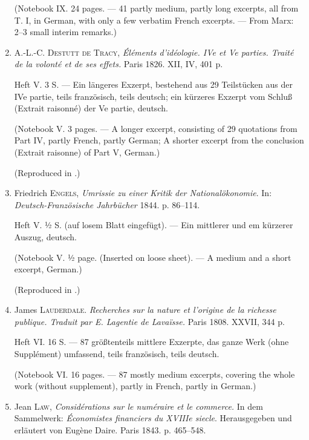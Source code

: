 \begin{enumerate}
    (Notebook IX. 24 pages. --- 41 partly medium, partly long excerpts, all from T. I, in German, with only a few verbatim French excerpts. --- From Marx: 2--3 small interim remarks.)
    
    \item A.-L.-C. \textsc{Destutt de Tracy}, \textit{Éléments d'idéologie. IVe et Ve parties. Traité de la volonté et de ses effets.} Paris 1826. XII, IV, 401 p.
    
    Heft V. 3 S. --- Ein längeres Exzerpt, bestehend aus 29 Teilstücken aus der IVe partie, teils französisch, teils deutsch; ein kürzeres Exzerpt vom Schluß (Extrait raisonné) der Ve partie, deutsch.
    
    (Notebook V. 3 pages. --- A longer excerpt, consisting of 29 quotations from Part IV, partly French, partly German; A shorter excerpt from the conclusion (Extrait raisonne) of Part V, German.)
    
    (Reproduced in .)
    
    \item Friedrich \textsc{Engels}, \textit{Umrissie zu einer Kritik der Nationalökonomie}. In: \textit{Deutsch-Französische Jahrbücher} 1844. p. 86--114.
    
    Heft V. ½ S. (auf losem Blatt eingefügt). --- Ein mittlerer und em kürzerer Auszug, deutsch.
    
    (Notebook V. ½ page. (Inserted on loose sheet). --- A medium and a short excerpt, German.)
    
    (Reproduced in .)
    
    \item James \textsc{Lauderdale}. \textit{Recherches sur la nature et l'origine de la richesse publique. Traduit par E. Lagentie de Lavaïsse.} Paris 1808. XXVII, 344 p.
    
    Heft VI. 16 S. --- 87 größtenteils mittlere Exzerpte, das ganze Werk (ohne Supplément) umfassend, teils französisch, teils deutsch.
    
    (Notebook VI. 16 pages. --- 87 mostly medium excerpts, covering the whole work (without supplement), partly in French, partly in German.)
    
    \item Jean \textsc{Law}, \textit{Considérations sur le numéraire et le commerce.} In dem Sammelwerk: \textit{Économistes financiers du XVIIIe siecle}. Herausgegeben und erläutert von Eugène Daire. Paris 1843. p. 465--548.
    

\end{enumerate}
